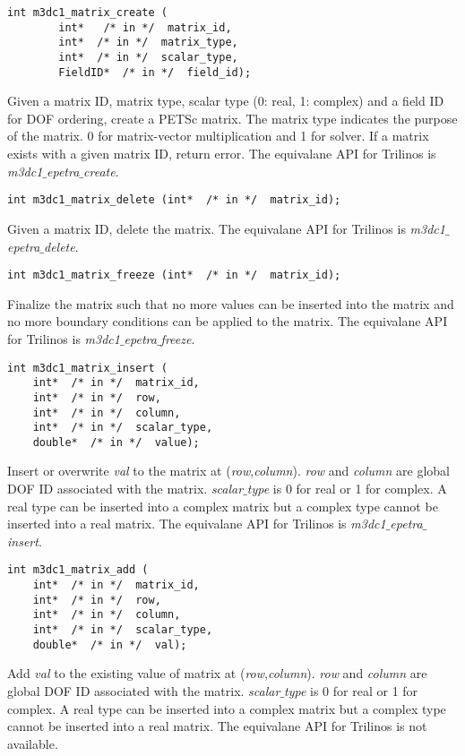 \begin{verbatim}
int m3dc1_matrix_create (
        int*   /* in */  matrix_id,
        int*  /* in */  matrix_type,
        int*  /* in */  scalar_type,  
        FieldID*  /* in */  field_id); 
\end{verbatim}\vspace{-.5cm}\hspace{1cm}
Given a matrix ID, matrix type, scalar type (0: real, 1: complex) and a field ID for DOF ordering, create a PETSc matrix. The matrix type indicates the purpose of the matrix. 0 for matrix-vector multiplication and 1 for solver. If a matrix exists with a given matrix ID, return error. The equivalane API for Trilinos is \textit{m3dc1$\_$epetra$\_$create}.

\begin{verbatim}
int m3dc1_matrix_delete (int*  /* in */  matrix_id); 
\end{verbatim}\vspace{-.5cm}\hspace{1cm}
Given a matrix ID, delete the matrix. The equivalane API for Trilinos is \textit{m3dc1$\_$epetra$\_$delete}.
	    
\begin{verbatim}
int m3dc1_matrix_freeze (int*  /* in */  matrix_id); 
\end{verbatim}\vspace{-.5cm}\hspace{1cm}
Finalize the matrix such that no more values can be inserted into the matrix and no more boundary conditions can be applied to the matrix. The equivalane API for Trilinos is \textit{m3dc1$\_$epetra$\_$freeze}.

\begin{verbatim}
int m3dc1_matrix_insert (
    int*  /* in */  matrix_id, 
    int*  /* in */  row, 
    int*  /* in */  column, 
    int*  /* in */  scalar_type, 
    double*  /* in */  value);
\end{verbatim}\vspace{-.5cm}\hspace{1cm}
Insert or overwrite \textit{val} to the matrix at (\textit{row},\textit{column}).
\textit{row} and \textit{column} are global DOF ID associated with the matrix.
\textit{scalar$\_$type} is 0 for real or 1 for complex. A real type can be inserted into a complex matrix but a complex type cannot be inserted into a real matrix. The equivalane API for Trilinos is \textit{m3dc1$\_$epetra$\_$insert}.

\begin{verbatim}
int m3dc1_matrix_add (
    int*  /* in */  matrix_id, 
    int*  /* in */  row, 
    int*  /* in */  column, 
    int*  /* in */  scalar_type, 
    double*  /* in */  val);
\end{verbatim}\vspace{-.5cm}\hspace{1cm}
Add \textit{val} to the existing value of matrix at (\textit{row},\textit{column}).
\textit{row} and \textit{column} are global DOF ID associated with the matrix.
\textit{scalar$\_$type} is 0 for real or 1 for complex. A real type can be inserted into a complex matrix but a complex type cannot be inserted into a real matrix.  The equivalane API for Trilinos is not available.

